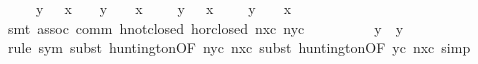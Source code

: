 \begin{isabellebody}
\ {}{}{}{}\ {}\ {}\ {}{}\ y\ {}\ {}\ x{}\ {}\ {}\ {}{}\ y\ {}\ {}\ {}{}\ x{}{}\ {}\ {}{}\ {}{}\ {}{}\ y{}\ {}\ {}\ x{}\ {}\ {}\ {}{}\ {}{}\ y{}\ {}\ {}\ {}{}\ x{}{}{}{}\isanewline
\ \ \ \ \ \ \isamarkupfalse%
\ {}smt\ assoc\ comm\ hnot{}closed\ hor{}closed\ nxc\ nyc{}\isanewline
\ \ \ \ \isamarkupfalse%
\ \isamarkupfalse%
\ {}{}{}{}\ {}\ y\ {}\ {}y{}\isanewline
\ \ \ \ \ \ \isamarkupfalse%
\ {}rule\ sym{}\ subst\ huntington{}OF\ nyc\ nxc{}{}\ subst\ huntington{}OF\ yc\ nxc{}{}\ simp{}\isanewline

\end{isabellebody}
